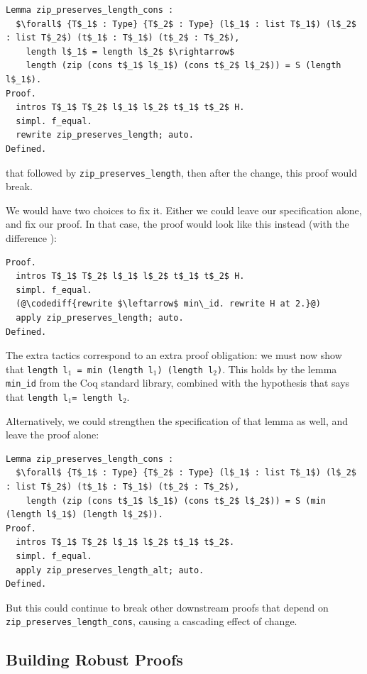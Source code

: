 \begin{lstlisting}
Lemma zip_preserves_length_cons :
  $\forall$ {T$_1$ : Type} {T$_2$ : Type} (l$_1$ : list T$_1$) (l$_2$ : list T$_2$) (t$_1$ : T$_1$) (t$_2$ : T$_2$),
    length l$_1$ = length l$_2$ $\rightarrow$
    length (zip (cons t$_1$ l$_1$) (cons t$_2$ l$_2$)) = S (length l$_1$).
Proof.
  intros T$_1$ T$_2$ l$_1$ l$_2$ t$_1$ t$_2$ H.
  simpl. f_equal.
  rewrite zip_preserves_length; auto.
Defined.
\end{lstlisting}
that followed by \lstinline{zip_preserves_length},
then after the change, this proof would break.

We would have two choices to fix it. Either we could leave our specification alone,
and fix our proof.
In that case,
the proof would look like this instead (with the difference ):

\begin{lstlisting}
Proof.
  intros T$_1$ T$_2$ l$_1$ l$_2$ t$_1$ t$_2$ H.
  simpl. f_equal.
  (@\codediff{rewrite $\leftarrow$ min\_id. rewrite H at 2.}@)
  apply zip_preserves_length; auto.
Defined.
\end{lstlisting}
The extra tactics correspond to an extra proof obligation:
we must now show that \lstinline{length l}$_1$\lstinline{ = min (length l}$_1$\lstinline{) (length l}$_2$\lstinline{)}.
This holds by the lemma \lstinline{min_id} from the Coq standard library, combined with the hypothesis that says that \lstinline{length l}$_1$\lstinline{= length l}$_2$.

Alternatively, we could strengthen the specification of that lemma as well, and leave the proof alone:

\begin{lstlisting}
Lemma zip_preserves_length_cons :
  $\forall$ {T$_1$ : Type} {T$_2$ : Type} (l$_1$ : list T$_1$) (l$_2$ : list T$_2$) (t$_1$ : T$_1$) (t$_2$ : T$_2$),
    length (zip (cons t$_1$ l$_1$) (cons t$_2$ l$_2$)) = S (min (length l$_1$) (length l$_2$)).
Proof.
  intros T$_1$ T$_2$ l$_1$ l$_2$ t$_1$ t$_2$.
  simpl. f_equal.
  apply zip_preserves_length_alt; auto.
Defined.
\end{lstlisting}
But this could continue to break other downstream proofs that depend on \lstinline{zip_preserves_length_cons},
causing a cascading effect of change.

\subsection{Building Robust Proofs}
\label{sec:processes}

